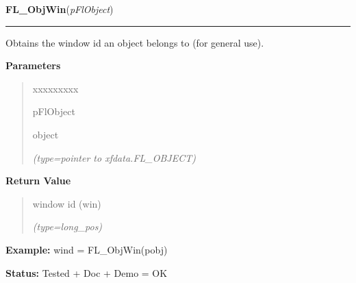     \label{xformslib:flxbasic:FL_ObjWin}

    \vspace{0.5ex}

\hspace{.8\funcindent}\begin{boxedminipage}{\funcwidth}

    \raggedright \textbf{FL\_ObjWin}(\textit{pFlObject})

    \vspace{-1.5ex}

    \rule{\textwidth}{0.5\fboxrule}
\setlength{\parskip}{2ex}
    Obtains the window id an object belongs to (for general use).

\setlength{\parskip}{1ex}
      \textbf{Parameters}
      \vspace{-1ex}

      \begin{quote}
        \begin{Ventry}{xxxxxxxxx}

          \item[pFlObject]

          object

            {\it (type=pointer to xfdata.FL\_OBJECT)}

        \end{Ventry}

      \end{quote}

      \textbf{Return Value}
    \vspace{-1ex}

      \begin{quote}
      window id (win)

      {\it (type=long\_pos)}

      \end{quote}

\textbf{Example:} wind = FL\_ObjWin(pobj)



\textbf{Status:} Tested + Doc + Demo = OK



    \end{boxedminipage}

    \label{xformslib:flxbasic:fl_get_real_object_window}

